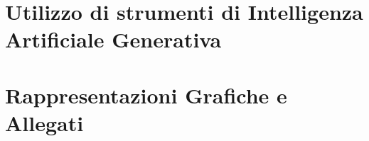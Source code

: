 \documentclass[conference]{IEEEtran}
\begin{document}
\clearpage
\onecolumn

\clearpage

\appendices

\section{Utilizzo di strumenti di Intelligenza Artificiale Generativa}\label{sec:appendix_ai_declaration}

\clearpage

\section{Rappresentazioni Grafiche e Allegati}\label{sec:appendix_graphics}
\end{document}
